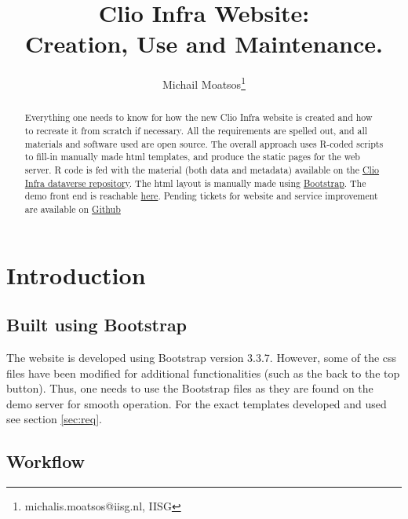\documentclass[a4paper]{article}
\title{Clio Infra Website:\\ Creation, Use and Maintenance.}
\author{Michail Moatsos\footnote{michalis.moatsos@iisg.nl, IISG}}
\begin{document}
\maketitle 
\begin{abstract}
Everything one needs to know for how the new Clio Infra website is created and 
how to recreate it from scratch if necessary. All the requirements are spelled 
out, and all materials and software used are open source. The overall approach 
uses R-coded scripts to fill-in manually made html templates, and produce the 
static pages for the web server. R code is fed with the material (both data and 
metadata) available on the 
\href{https://datasets.socialhistory.org/dataverse/clioinfra}{Clio Infra 
dataverse repository}. The html layout is manually made using 
\href{http://getbootstrap.com/}{Bootstrap}. The demo front end is reachable 
\href{clio2.sandbox.socialhistoryservices.org}{here}. Pending tickets for 
website and service improvement are available on 
\href{
https://github.com/CLARIAH/wp4-requirements/issues?q=is%
3Aclio-infra%
\end{abstract}

\clearpage

\tableofcontents

\clearpage

\section{Introduction}\label{sec:intro}



\subsection{Built using Bootstrap}

The website is developed using Bootstrap version 3.3.7. However, some of the 
css files have been modified for additional functionalities (such as the back 
to the top button). Thus, one needs to use the Bootstrap files as they are 
found on the demo server for smooth operation. For the exact templates 
developed and used see section \ref{sec:req}.

\subsection{Workflow}
\end{document}
